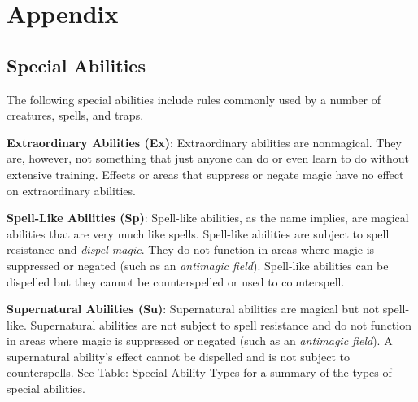 \chapter{Appendix}
\section{Special Abilities}

\label{f0}				
The following special abilities include rules commonly used by a number of creatures, spells, and traps.
				
\textbf{Extraordinary Abilities (Ex)}: Extraordinary abilities are nonmagical. They are, however, not something that just anyone can do or even learn to do without extensive training. Effects or areas that suppress or negate magic have no effect on extraordinary abilities.
				
\textbf{Spell-Like Abilities (Sp)}: Spell-like abilities, as the name implies, are magical abilities that are very much like spells. Spell-like abilities are subject to spell resistance and \textit{dispel magic}. They do not function in areas where magic is suppressed or negated (such as an \textit{antimagic field}). Spell-like abilities can be dispelled but they cannot be counterspelled or used to counterspell.
				
\textbf{Supernatural Abilities (Su)}: Supernatural abilities are magical but not spell-like. Supernatural abilities are not subject to spell resistance and do not function in areas where magic is suppressed or negated (such as an \textit{antimagic field}). A supernatural ability's effect cannot be dispelled and is not subject to counterspells. See Table: Special Ability Types for a summary of the types of special abilities.


